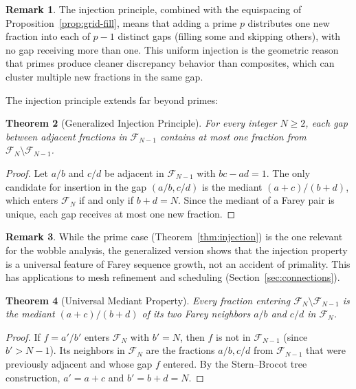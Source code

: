 \documentclass[11pt]{article}
\newtheorem{theorem}{Theorem}[section]
\theoremstyle{definition}
\newtheorem{remark}[theorem]{Remark}
\newcommand{\F}{\mathcal{F}}
\begin{document}
\begin{remark}
The injection principle, combined with the equispacing of
Proposition~\ref{prop:grid-fill}, means that adding a prime $p$
distributes one new fraction into each of $p - 1$ distinct gaps
(filling some and skipping others), with no gap receiving more
than one.  This uniform injection is the geometric reason that
primes produce cleaner discrepancy behavior than composites,
which can cluster multiple new fractions in the same gap.
\end{remark}

The injection principle extends far beyond primes:

\begin{theorem}[Generalized Injection Principle]\label{thm:gen-injection}
For every integer $N \ge 2$, each gap between adjacent fractions in
$\F_{N-1}$ contains at most one fraction from $\F_N \setminus \F_{N-1}$.
\end{theorem}

\begin{proof}
Let $a/b$ and $c/d$ be adjacent in $\F_{N-1}$ with $bc - ad = 1$.
The only candidate for insertion in the gap $(a/b, c/d)$ is the
mediant $(a+c)/(b+d)$, which enters $\F_N$ if and only if
$b + d = N$.  Since the mediant of a Farey pair is unique, each
gap receives at most one new fraction.
\end{proof}

\begin{remark}
While the prime case (Theorem~\ref{thm:injection}) is the one
relevant for the wobble analysis, the generalized version shows
that the injection property is a universal feature of Farey
sequence growth, not an accident of primality.  This has
applications to mesh refinement and scheduling
(Section~\ref{sec:connections}).
\end{remark}

\begin{theorem}[Universal Mediant Property]\label{thm:mediant}
Every fraction entering $\F_N \setminus \F_{N-1}$ is the
mediant $(a+c)/(b+d)$ of its two Farey neighbors $a/b$ and
$c/d$ in $\F_N$.
\end{theorem}

\begin{proof}
If $f = a'/b'$ enters $\F_N$ with $b' = N$, then $f$ is
not in $\F_{N-1}$ (since $b' > N-1$).  Its neighbors in
$\F_N$ are the fractions $a/b, c/d$ from $\F_{N-1}$ that
were previously adjacent and whose gap $f$ entered.  By
the Stern--Brocot tree construction, $a' = a+c$ and
$b' = b+d = N$.
\end{proof}
\end{document}
